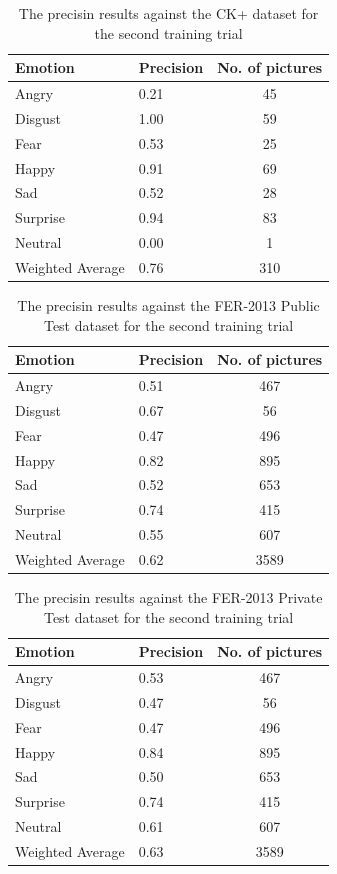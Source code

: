 \documentclass[runningheads,a4paper,11pt]{report}
\begin{document}
\begin{table}[htbp]
	\caption{The precisin results against the CK+ dataset for the second training trial}
	\label{fer_training_28k_01_ckp}
		\begin{center}
			\begin{tabular}{p{110pt}p{110pt}c}
				\textbf{Emotion}& \textbf{Precision}& \textbf{No. of pictures} \\
				\hline\hline
				Angry& 0.21& 45 \\
				Disgust& 1.00& 59 \\
				Fear& 0.53& 25 \\
				Happy& 0.91& 69 \\
				Sad& 0.52& 28 \\
				Surprise& 0.94& 83 \\
				Neutral& 0.00& 1 \\
				\hline
				Weighted Average& 0.76& 310
			\end{tabular}
		\end{center}
\end{table}
\begin{table}[htbp]
	\caption{The precisin results against the FER-2013 Public Test dataset for the second training trial}
	\label{fer_training_28k_01_public_test}
		\begin{center}
			\begin{tabular}{p{110pt}p{110pt}c}
				\textbf{Emotion}& \textbf{Precision}& \textbf{No. of pictures} \\
				\hline\hline
				Angry& 0.51& 467 \\
				Disgust& 0.67& 56 \\
				Fear& 0.47& 496 \\
				Happy& 0.82& 895 \\
				Sad& 0.52& 653 \\
				Surprise& 0.74& 415 \\
				Neutral& 0.55& 607 \\
				\hline
				Weighted Average& 0.62 &3589
			\end{tabular}
		\end{center}
\end{table}
\begin{table}[htbp]
	\caption{The precisin results against the FER-2013 Private Test dataset for the second training trial}
	\label{fer_training_28k_01_private_test}
		\begin{center}
			\begin{tabular}{p{110pt}p{110pt}c}
				\textbf{Emotion}& \textbf{Precision}& \textbf{No. of pictures} \\
				\hline\hline
				Angry& 0.53& 467 \\
				Disgust& 0.47& 56 \\
				Fear& 0.47& 496 \\
				Happy& 0.84& 895 \\
				Sad& 0.50& 653 \\
				Surprise& 0.74& 415 \\
				Neutral& 0.61& 607 \\
				\hline
				Weighted Average& 0.63 &3589
			\end{tabular}
		\end{center}
\end{table}
\end{document}
